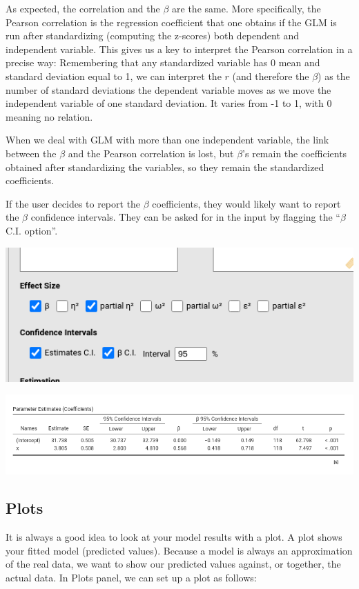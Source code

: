 \documentclass[
]{book}
\begin{document}
As expected, the correlation and the \(\beta\) are the same. More specifically, the Pearson correlation is the regression coefficient that one obtains if the GLM is run after standardizing (computing the z-scores) both dependent and independent variable. This gives us a key to interpret the Pearson correlation in a precise way: Remembering that any standardized variable has 0 mean and standard deviation equal to 1, we can interpret the \(r\) (and therefore the \(\beta\)) as the number of standard deviations the dependent variable moves as we move the independent variable of one standard deviation. It varies from -1 to 1, with 0 meaning no relation.

When we deal with GLM with more than one independent variable, the link between the \(\beta\) and the Pearson correlation is lost, but \(\beta\)'s remain the coefficients obtained after standardizing the variables, so they remain the standardized coefficients.

If the user decides to report the \(\beta\) coefficients, they would likely want to report the \(\beta\) confidence intervals. They can be asked for in the input by flagging the ``\(\beta\) C.I. option''.

\includegraphics[width=0.9\linewidth]{bookletpics/2_simple_input9}

\includegraphics[width=0.9\linewidth]{bookletpics/2_simple_output9}

\hypertarget{glmplot}{%
\subsection{Plots}\label{glmplot}}

It is always a good idea to look at your model results with a plot. A plot shows your fitted model (predicted values). Because a model is always an approximation of the real data, we want to show our predicted values against, or together, the actual data. In {Plots} panel, we can set up a plot as follows:
\end{document}
